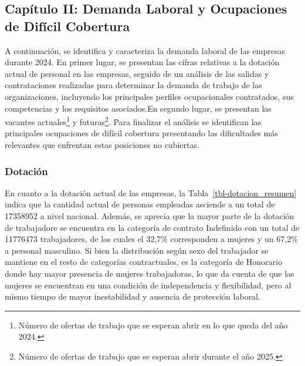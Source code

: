 \documentclass[
  11pt,
]{article}
\begin{document}
\FloatBarrier

\subsection{Capítulo II: Demanda Laboral y Ocupaciones de Difícil
Cobertura}\label{capuxedtulo-ii-demanda-laboral-y-ocupaciones-de-difuxedcil-cobertura}

A continuación, se identifica y caracteriza la demanda laboral de las
empresas durante 2024. En primer lugar, se presentan las cifras
relativas a la dotación actual de personal en las empresas, seguido de
un análisis de las salidas y contrataciones realizadas para determinar
la demanda de trabajo de las organizaciones, incluyendo los principales
perfiles ocupacionales contratados, sus competencias y los requisitos
asociados.En segundo lugar, se presentan las vacantes
actuales\footnote{Número de ofertas de trabajo que se esperan abrir en
  lo que queda del año 2024.} y futuras\footnote{Número de ofertas de
  trabajo que se esperan abrir durante el año 2025.}. Para finalizar el
análisis se identifican las principales ocupaciones de difícil cobertura
presentando las dificultades más relevantes que enfrentan estas
posiciones no cubiertas.

\subsubsection{Dotación}\label{dotaciuxf3n}

En cuanto a la dotación actual de las empresas, la
Tabla~\ref{tbl-dotacion_resumen} indica que la cantidad actual de
personas empleadas asciende a un total de 17358952 a nivel nacional.
Además, se aprecia que la mayor parte de la dotación de trabajadore se
encuentra en la categoría de contrato Indefinido con un total de
11776473 trabajadores, de los cuales el 32,7\% corresponden a mujeres y
un 67,2\% a personal masculino. Si bien la distribución según sexo del
trabajador se mantiene en el resto de categorías contractuales, es la
categoría de Honorario donde hay mayor presencia de mujeres
trabajadoras, lo que da cuenta de que las mujeres se encuentran en una
condición de independencia y flexibilidad, pero al mismo tiempo de mayor
inestabilidad y ausencia de protección laboral.

\FloatBarrier
\end{document}
